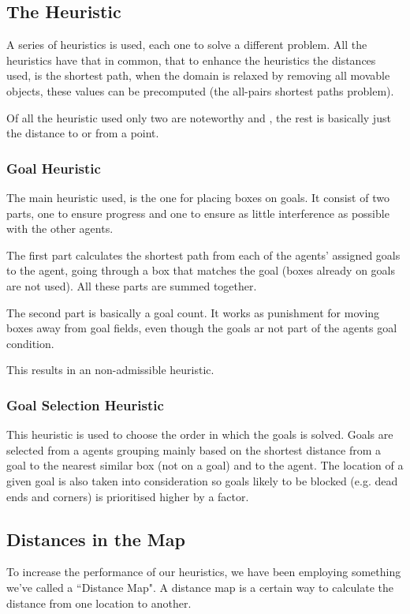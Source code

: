 \documentclass[letterpaper]{article}
\begin{document}
 
	\subsection{The Heuristic}
		A series of heuristics is used, each one to solve a different problem. All the heuristics have that in common, that to enhance the heuristics the distances used, is the shortest path, when the domain is relaxed by removing all movable objects, these values can be precomputed (the all-pairs shortest paths problem).
		
		Of all the heuristic used only two are noteworthy  and , the rest is basically just the distance to or from a point.
		\subsubsection{Goal Heuristic}\label{Goal1}
			The main heuristic used, is the one for placing boxes on goals. It consist of two parts, one to ensure progress and one to ensure as little interference as possible with the other agents.
			
			The first part calculates the shortest path from each of the agents' assigned goals to the agent, going through a box that matches the goal (boxes already on goals are not used). All these parts are summed together.
			
			The second part is basically a goal count. It works as punishment for moving boxes away from goal fields, even though the goals ar not part of the agents goal condition.
			
			This results in an non-admissible heuristic.
		
		\subsubsection{Goal Selection Heuristic}\label{goal2}
			This heuristic is used to choose the order in which the goals is solved. Goals are selected from a agents grouping mainly based on the shortest distance from a goal to the nearest similar box (not on a goal) and to the agent. The location of a given goal is also taken into consideration so goals likely to be blocked (e.g. dead ends and corners) is prioritised higher by a factor.

				
			
	\subsection{Distances in the Map}
		To increase the performance of our heuristics, we have been employing something we've called a ``Distance Map". A distance map is a certain way to calculate the distance from one location to another.
			
\end{document}
